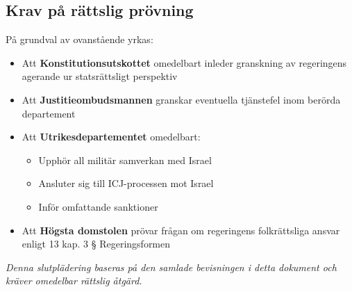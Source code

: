 \subsection*{Krav på rättslig prövning}
På grundval av ovanstående yrkas:

\begin{itemize}
    \item Att \textbf{Konstitutionsutskottet} omedelbart inleder granskning av regeringens agerande ur statsrättsligt perspektiv
    
    \item Att \textbf{Justitieombudsmannen} granskar eventuella tjänstefel inom berörda departement
    
    \item Att \textbf{Utrikesdepartementet} omedelbart:
    \begin{itemize}
        \item Upphör all militär samverkan med Israel
        \item Ansluter sig till ICJ-processen mot Israel
        \item Inför omfattande sanktioner
    \end{itemize}
    
    \item Att \textbf{Högsta domstolen} prövar frågan om regeringens folkrättsliga ansvar enligt 13 kap. 3 § Regeringsformen
\end{itemize}

\textit{Denna slutplädering baseras på den samlade bevisningen i detta dokument och kräver omedelbar rättslig åtgärd.}